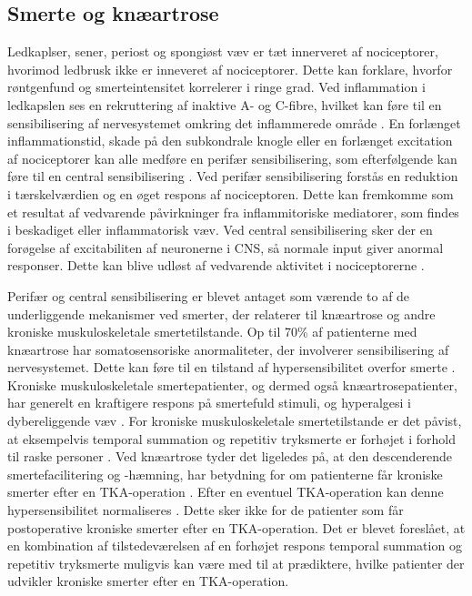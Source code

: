 \subsection{Smerte og knæartrose}
Ledkaplser, sener, periost og spongiøst væv er tæt innerveret af nociceptorer, hvorimod ledbrusk ikke er inneveret af nociceptorer. Dette kan forklare, hvorfor  røntgenfund og smerteintensitet korrelerer i ringe grad. \citep{Petersen2016}  \citep{smerter}
Ved inflammation i ledkapslen ses en rekruttering af inaktive A- og C-fibre, hvilket kan føre til en sensibilisering af nervesystemet omkring det inflammerede område \citep{smerter}. En forlænget inflammationstid, skade på den subkondrale knogle eller en forlænget excitation af nociceptorer kan alle medføre en perifær sensibilisering, som efterfølgende kan føre til en central sensibilisering \citep{Petersen2016}.
Ved perifær sensibilisering forstås en reduktion i tærskelværdien og en øget respons af nociceptoren. Dette kan fremkomme som et resultat af vedvarende påvirkninger fra inflammitoriske mediatorer, som findes i beskadiget eller inflammatorisk væv. 
Ved central sensibilisering sker der en forøgelse af excitabiliten af neuronerne i CNS, så normale input giver anormal responser. Dette kan blive udløst af vedvarende aktivitet i nociceptorerne \citep{nature}.

Perifær og central sensibilisering er blevet antaget som værende to af de underliggende mekanismer ved smerter, der relaterer til knæartrose og andre kroniske muskuloskeletale smertetilstande. Op til 70\% af patienterne med knæartrose har somatosensoriske anormaliteter, der involverer sensibilisering af nervesystemet.  \citep{Arendt-Nielsen2010} \citep{lars} Dette kan føre til en tilstand af hypersensibilitet overfor smerte \citep{Petersen2016}. Kroniske muskuloskeletale smertepatienter, og dermed også knæartrosepatienter, har generelt en kraftigere respons på smertefuld stimuli, og hyperalgesi i dybereliggende væv \citep{Arendt-Nielsen2010}. For kroniske muskuloskeletale smertetilstande er det påvist, at eksempelvis temporal summation og repetitiv tryksmerte er forhøjet i forhold til raske personer \citep{widespread}. Ved knæartrose tyder det ligeledes på, at den descenderende smertefacilitering og -hæmning, har betydning for om patienterne får kroniske smerter efter en TKA-operation \citep{Petersen2016}. Efter en eventuel TKA-operation kan denne hypersensibilitet normaliseres \citep{Petersen2016}  \citep{graven2012}. Dette sker ikke for de patienter som får postoperative kroniske smerter efter en TKA-operation. 
Det er blevet foreslået, at en kombination af tilstedeværelsen af en forhøjet respons temporal summation og repetitiv tryksmerte muligvis kan være med til at prædiktere, hvilke patienter der udvikler kroniske smerter efter en TKA-operation. \citep{Petersen2016}


